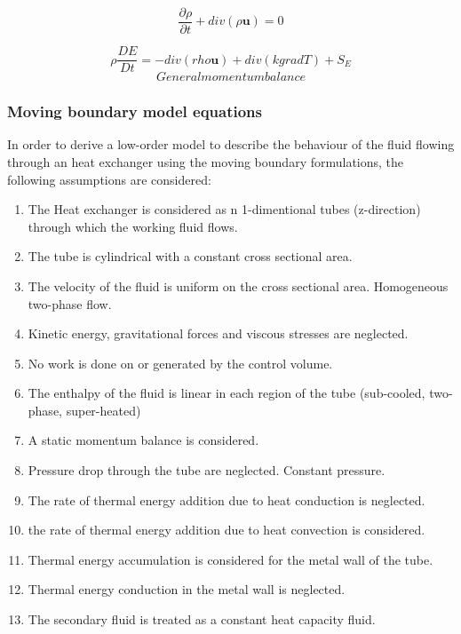 \documentclass[11pt]{article} %
\begin{document}
\begin{equation}
\label{eq:GenMass}
\frac{\partial \rho}{\partial t} + div(\rho \textbf{u})= 0
\end{equation}


\begin{equation}
\label{eq:GenEnergy}
\rho \frac{DE}{Dt} = - div(rho\textbf{u}) + div(k grad T) + S_E
\end{equation}
\begin{equation}
\label{eq:GenMomentum}
General momentum balance
\end{equation}

\subsubsection{Moving boundary model equations}
\label{subsub: MBequations}
In order to derive a low-order model to describe the behaviour of the fluid flowing through an heat exchanger using the moving boundary formulations, the following assumptions are considered:
\begin{enumerate}
\renewcommand{\theenumi}{\roman{enumi}}
\item The Heat exchanger is considered as n 1-dimentional tubes (z-direction) through which the working fluid flows.
\item The tube is cylindrical with a constant cross sectional area.
\item The velocity of the fluid is uniform on the cross sectional area. Homogeneous two-phase flow.
\item Kinetic energy, gravitational forces and viscous stresses are neglected.
\item No work is done on or generated by the control volume.
\item The enthalpy of the fluid is linear in each region of the tube (sub-cooled, two-phase, super-heated)
\item A static momentum balance is considered.
\item Pressure drop through the tube are neglected. Constant pressure.
\item The rate of thermal energy addition due to heat conduction is neglected.
\item the rate of thermal energy addition due to heat convection is considered.
\item Thermal energy accumulation is considered for the metal wall of the tube.
\item Thermal energy conduction in the metal wall is neglected.
\item The secondary fluid is treated as a constant heat capacity fluid.
\end{enumerate}
\end{document}
